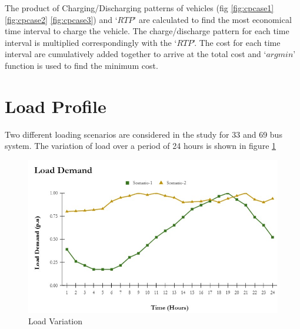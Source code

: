 	
		The product of Charging/Discharging patterns of vehicles (fig \ref{fig:cpcase1} \ref{fig:cpcase2} \ref{fig:cpcase3}) and `$RTP$' are calculated to find the most economical time interval to charge the vehicle. The charge/discharge pattern for each time interval is multiplied correspondingly with the `$RTP$'. The cost for each time interval are cumulatively added together to arrive at the total cost and `$argmin$' function is used to find the minimum cost. 
	
	
	\section{Load Profile}
		Two different loading scenarios are considered in the study for 33 and 69 bus system. The variation of load over a period of 24 hours is shown in figure \ref{fig:loaddemand}
	
		\begin{figure}[!h]
			\centering
			\includegraphics[scale=0.65]{Figures/load_demand}
			\caption{Load Variation}
			\label{fig:loaddemand}
		\end{figure}
		

		
	
		
	
	